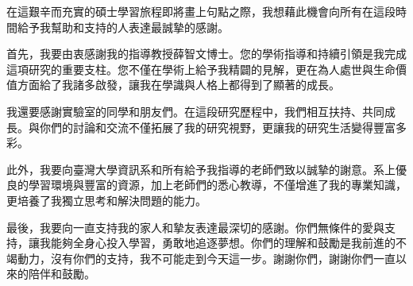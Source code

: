 
\begin{acknowledgement}
  在這艱辛而充實的碩士學習旅程即將畫上句點之際，我想藉此機會向所有在這段時間給予我幫助和支持的人表達最誠摯的感謝。

  首先，我要由衷感謝我的指導教授薛智文博士。您的學術指導和持續引領是我完成這項研究的重要支柱。您不僅在學術上給予我精闢的見解，更在為人處世與生命價值方面給了我諸多啟發，讓我在學識與人格上都得到了顯著的成長。

  我還要感謝實驗室的同學和朋友們。在這段研究歷程中，我們相互扶持、共同成長。與你們的討論和交流不僅拓展了我的研究視野，更讓我的研究生活變得豐富多彩。

  此外，我要向臺灣大學資訊系和所有給予我指導的老師們致以誠摯的謝意。系上優良的學習環境與豐富的資源，加上老師們的悉心教導，不僅增進了我的專業知識，更培養了我獨立思考和解決問題的能力。
  
  最後，我要向一直支持我的家人和摯友表達最深切的感謝。你們無條件的愛與支持，讓我能夠全身心投入學習，勇敢地追逐夢想。你們的理解和鼓勵是我前進的不竭動力，沒有你們的支持，我不可能走到今天這一步。謝謝你們，謝謝你們一直以來的陪伴和鼓勵。
\end{acknowledgement}